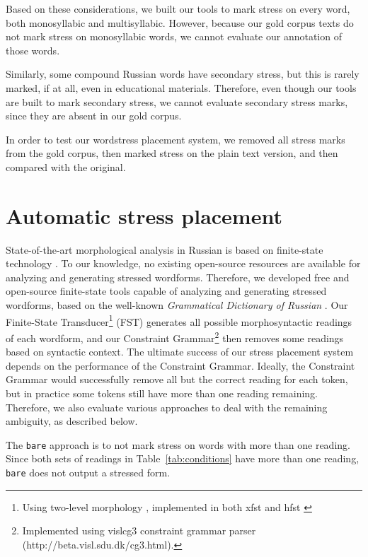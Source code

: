 \documentclass[11pt]{article}
\begin{document}
Based on these considerations, we built our tools to mark stress on every
word, both monosyllabic and multisyllabic. However, because our gold corpus texts 
do not mark stress on monosyllabic words, we cannot evaluate our annotation of 
those words.

Similarly, some compound Russian words have secondary stress, but this is rarely 
marked, if at all, even in educational materials. Therefore, even though our 
tools are built to mark secondary stress, we cannot evaluate secondary stress
marks, since they are absent in our gold corpus.

In order to test our wordstress placement system, we removed all stress marks
from the gold corpus, then marked stress on the plain text version, and then
compared with the original.

\section{Automatic stress placement}

State-of-the-art morphological analysis in Russian is based on finite-state
technology \cite{Nozhov-03,Segalovich-03}. To our knowledge, no existing 
open-source resources are available for analyzing and generating 
stressed wordforms. Therefore, we developed free and open-source finite-state 
tools capable of analyzing and generating stressed wordforms, based on the
well-known \emph{Grammatical Dictionary of Russian} \cite{Zaliznjak-77}.
Our Finite-State Transducer\footnote{Using two-level 
morphology \cite{Koskenniemi-84}, implemented in both xfst
\cite{Beesley.Karttunen-03} and hfst \cite{hfst-11}} (FST) generates all possible 
morphosyntactic readings of each wordform, and our Constraint 
Grammar\footnote{Implemented using vislcg3 constraint grammar parser
(http://beta.visl.sdu.dk/cg3.html).}
\cite{Karlsson-90,Karlsson.Voutilainen.ea-95} then removes
some readings based on syntactic context. The ultimate success of our 
stress placement system depends on the performance of the Constraint Grammar. 
Ideally, the Constraint Grammar would successfully remove all but the correct 
reading for each token, but in practice some
tokens still have more than one reading remaining. Therefore,
we also evaluate various approaches to deal with the remaining ambiguity,
as described below.

The {\small {\tt bare}} approach is to not mark stress on words with more than 
one reading. Since both sets of readings in Table~\ref{tab:conditions} have more
than one reading, {\small {\tt bare}} does not output a stressed form. 
\end{document}
